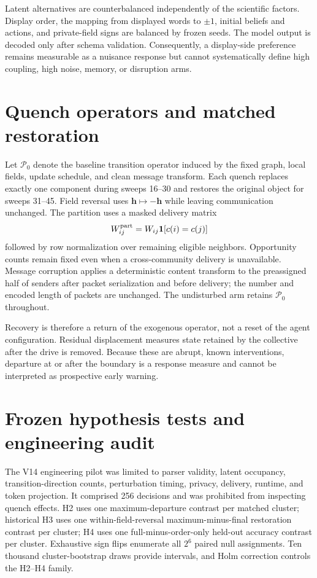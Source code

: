 \documentclass[12pt]{article}
\begin{document}
Latent alternatives are counterbalanced independently of the scientific
factors.  Display order, the mapping from displayed words to $\pm1$, initial
beliefs and actions, and private-field signs are balanced by frozen seeds.  The
model output is decoded only after schema validation.  Consequently, a
display-side preference remains measurable as a nuisance response but cannot
systematically define high coupling, high noise, memory, or disruption arms.

\section{Quench operators and matched restoration}

Let $\mathcal P_0$ denote the baseline transition operator induced by the
fixed graph, local fields, update schedule, and clean message transform.  Each
quench replaces exactly one component during sweeps 16--30 and restores the
original object for sweeps 31--45.  Field reversal uses
$\bm h\mapsto-\bm h$ while leaving communication unchanged.  The partition
uses a masked delivery matrix
\begin{equation}
W^{\rm part}_{ij}=W_{ij}\mathbf 1[c(i)=c(j)]
\end{equation}
followed by row normalization over remaining eligible neighbors.  Opportunity
counts remain fixed even when a cross-community delivery is unavailable.
Message corruption applies a deterministic content transform to the
preassigned half of senders after packet serialization and before delivery;
the number and encoded length of packets are unchanged.  The undisturbed arm
retains $\mathcal P_0$ throughout.

Recovery is therefore a return of the exogenous operator, not a reset of the
agent configuration.  Residual displacement measures state retained by the
collective after the drive is removed.  Because these are abrupt, known
interventions, departure at or after the boundary is a response measure and
cannot be interpreted as prospective early warning.

\section{Frozen hypothesis tests and engineering audit}

The V14 engineering pilot was limited to parser validity, latent occupancy,
transition-direction counts, perturbation timing, privacy, delivery, runtime,
and token projection. It comprised 256 decisions and was prohibited from
inspecting quench effects. H2 uses one maximum-departure contrast per matched
cluster; historical H3 uses one within-field-reversal maximum-minus-final
restoration contrast per cluster; H4 uses one full-minus-order-only held-out accuracy
contrast per cluster. Exhaustive sign flips enumerate all $2^6$ paired null
assignments. Ten thousand cluster-bootstrap draws provide intervals, and Holm
correction controls the H2--H4 family.
\end{document}
